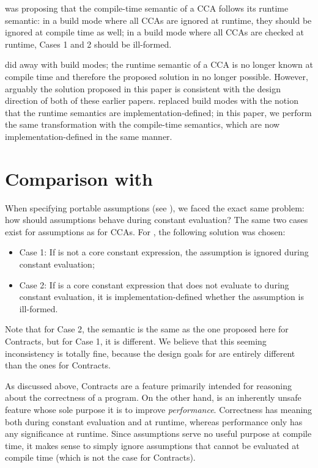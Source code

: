 \cite{P2834R1} was proposing that the compile-time semantic of a CCA follows its runtime semantic: in a build mode where all CCAs are ignored at runtime, they should be ignored at compile time as well; in a build mode where all CCAs are checked at runtime, Cases 1 and 2 should be ill-formed.

\cite{P2877R0} did away with build modes; the runtime semantic of a CCA is no longer known at compile time and therefore the proposed solution in \cite{P2834R1} no longer possible. However, arguably the solution proposed in this paper is consistent with the design direction of both of these earlier papers. \cite{P2877R0} replaced build modes with the notion that the runtime semantics are implementation-defined; in this paper, we perform the same transformation with the compile-time semantics, which are now implementation-defined in the same manner.

\section{Comparison with \tcode{[[assume]]}}

When specifying portable assumptions (see \cite{P1774R8}), we faced the exact same problem: how should assumptions behave during constant evaluation? The same two cases exist for assumptions as for CCAs. For , the following solution was chosen:

\begin{itemize}
\item Case 1: If  is not a core constant expression, the assumption is ignored during constant evaluation;
\item Case 2: If  is a core constant expression that does not evaluate to  during constant evaluation, it is implementation-defined whether the assumption is ill-formed.
\end{itemize}

Note that for Case 2, the semantic is the same as the one proposed here for Contracts, but for Case 1, it is different. We believe that this seeming inconsistency is totally fine, because the design goals for \tcode{[[assume]]} are entirely different than the ones for Contracts.

As discussed above, Contracts are a feature primarily intended for reasoning about the correctness of a program. On the other hand, \tcode{[[assume]]} is an inherently unsafe feature whose sole purpose it is to improve \emph{performance}. Correctness has meaning both during constant evaluation and at runtime, whereas performance only has any significance at runtime. Since assumptions serve no useful purpose at compile time, it makes sense to simply ignore assumptions that cannot be evaluated at compile time (which is not the case for Contracts).

